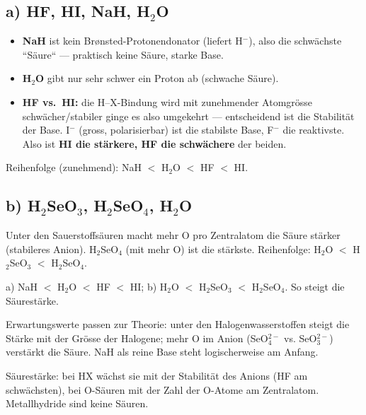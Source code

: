 
\subsection*{a) HF, HI, NaH, H$_2$O}
\begin{itemize}
  \item \textbf{NaH} ist kein Brønsted-Protonendonator (liefert H$^-$), also
        die schwächste ``Säure`` --- praktisch keine Säure, starke Base.
  \item \textbf{H$_2$O} gibt nur sehr schwer ein Proton ab (schwache Säure).
  \item \textbf{HF vs.\ HI:} die H--X-Bindung wird mit zunehmender Atomgrösse
        schwächer/stabiler ginge es also umgekehrt --- entscheidend ist die
        Stabilität der Base. I$^-$ (gross, polarisierbar) ist die stabilste
        Base, F$^-$ die reaktivste. Also ist \textbf{HI die stärkere,
        HF die schwächere} der beiden.
\end{itemize}
Reihenfolge (zunehmend): NaH $<$ H$_2$O $<$ HF $<$ HI.

\subsection*{b) H$_2$SeO$_3$, H$_2$SeO$_4$, H$_2$O}
Unter den Sauerstoffsäuren macht mehr O pro Zentralatom die Säure stärker
(stabileres Anion). H$_2$SeO$_4$ (mit mehr O) ist die stärkste.
Reihenfolge: H$_2$O $<$ H$_2$SeO$_3$ $<$ H$_2$SeO$_4$.

\begin{ergebnis}
a) NaH $<$ H$_2$O $<$ HF $<$ HI;
b) H$_2$O $<$ H$_2$SeO$_3$ $<$ H$_2$SeO$_4$.
So steigt die Säurestärke.
\end{ergebnis}

\begin{kontrolle}
Erwartungswerte passen zur Theorie: unter den Halogenwasserstoffen steigt
die Stärke mit der Grösse der Halogene; mehr O im Anion (SeO$_4^{2-}$ vs.
SeO$_3^{2-}$) verstärkt die Säure. NaH als reine Base steht logischerweise
am Anfang.
\end{kontrolle}

\begin{merksatz}
Säurestärke: bei HX wächst sie mit der Stabilität des Anions (HF am
schwächsten), bei O-Säuren mit der Zahl der O-Atome am Zentralatom.
Metallhydride sind keine Säuren.
\end{merksatz}
